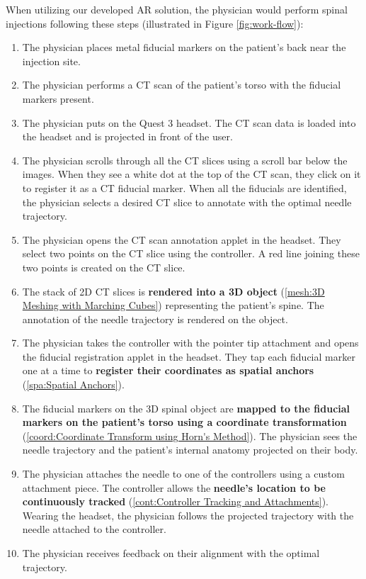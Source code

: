 \documentclass[12pt]{article}
\begin{document}
When utilizing our developed AR solution, the physician would perform spinal injections following these steps (illustrated in Figure \ref{fig:work-flow}):
\begin{enumerate}
    \item The physician places metal fiducial markers on the patient's back near the injection site.
    \item The physician performs a CT scan of the patient's torso with the fiducial markers present.
    \item The physician puts on the Quest 3 headset. The CT scan data is loaded into the headset and is projected in front of the user.
    \item The physician scrolls through all the CT slices using a scroll bar below the images. When they see a white dot at the top of the CT scan, they click on it to register it as a CT fiducial marker. When all the fiducials are identified, the physician selects a desired CT slice to annotate with the optimal needle trajectory.
    \item The physician opens the CT scan annotation applet in the headset. They select two points on the CT slice using the controller. A red line joining these two points is created on the CT slice.
    \item The stack of 2D CT slices is \textbf{rendered into a 3D object} (\ref{mesh:3D Meshing with Marching Cubes}) representing the patient's spine. The annotation of the needle trajectory is rendered on the object.
    \item The physician takes the controller with the pointer tip attachment and opens the fiducial registration applet in the headset. They tap each fiducial marker one at a time to \textbf{register their coordinates as spatial anchors} (\ref{spa:Spatial Anchors}).
    \item The fiducial markers on the 3D spinal object are \textbf{mapped to the fiducial markers on the patient's torso using a coordinate transformation} (\ref{coord:Coordinate Transform using Horn's Method}). The physician sees the needle trajectory and the patient's internal anatomy projected on their body.
    \item The physician attaches the needle to one of the controllers using a custom attachment piece. The controller allows the \textbf{needle's location to be continuously tracked} (\ref{cont:Controller Tracking and Attachments}). Wearing the headset, the physician follows the projected trajectory with the needle attached to the controller.
    \item The physician receives feedback on their alignment with the optimal trajectory.
\end{enumerate}
\end{document}
